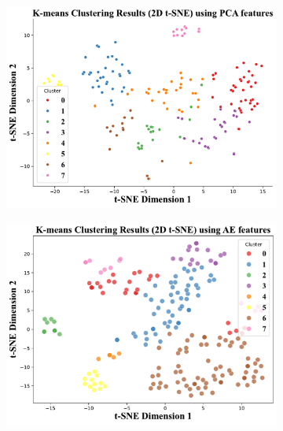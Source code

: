 \documentclass{article} %
\begin{document}
\begin{figure}[!t]
    \centering
    \begin{subfigure}{.24\textwidth}  %
        \centering
        \includegraphics[width=1.0\linewidth]{./figures/PCA_kmeans_tsne_2d.pdf}
        \vspace{-5pt}
        \label{fig:visual1}
    \end{subfigure}
    \hfill %
    \begin{subfigure}{.24\textwidth}
        \centering
        \includegraphics[width=1.0\linewidth]{./figures/AE_kmeans_tsne_2d.pdf}

\end{subfigure}
\end{figure}
\end{document}
